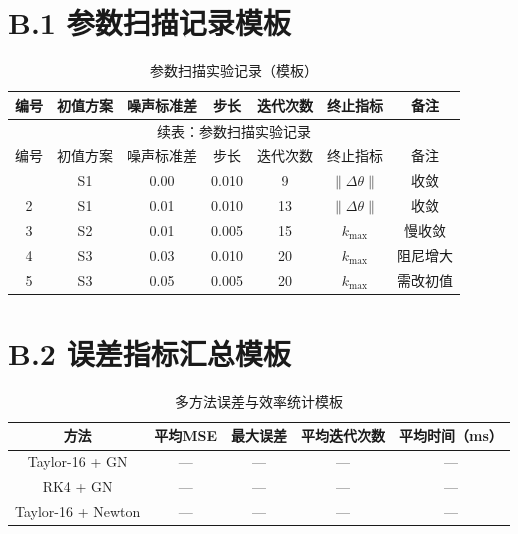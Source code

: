 \section*{B.1 参数扫描记录模板}
{
\renewcommand{\arraystretch}{1.2}
\footnotesize
\begin{longtable}{ccccccc}
\caption{参数扫描实验记录（模板）}\\
\toprule
编号 & 初值方案 & 噪声标准差 & 步长 & 迭代次数 & 终止指标 & 备注 \\
\midrule
\endfirsthead
\multicolumn{7}{c}{续表：参数扫描实验记录}\\
\toprule
编号 & 初值方案 & 噪声标准差 & 步长 & 迭代次数 & 终止指标 & 备注 \\
\midrule
\endhead
\bottomrule
\endfoot
1 & S1 & 0.00 & 0.010 & 9 & $\|\Delta\theta\|$ & 收敛 \\
2 & S1 & 0.01 & 0.010 & 13 & $\|\Delta\theta\|$ & 收敛 \\
3 & S2 & 0.01 & 0.005 & 15 & $k_{\max}$ & 慢收敛 \\
4 & S3 & 0.03 & 0.010 & 20 & $k_{\max}$ & 阻尼增大 \\
5 & S3 & 0.05 & 0.005 & 20 & $k_{\max}$ & 需改初值 \\
\end{longtable}
}

\section*{B.2 误差指标汇总模板}
\begin{table}[H]
\centering
\caption{多方法误差与效率统计模板}
\begin{tabular}{ccccc}
\toprule
方法 & 平均MSE & 最大误差 & 平均迭代次数 & 平均时间（ms） \\
\midrule
Taylor-16 + GN & --- & --- & --- & --- \\
RK4 + GN & --- & --- & --- & --- \\
Taylor-16 + Newton & --- & --- & --- & --- \\
\bottomrule
\end{tabular}
\end{table}
